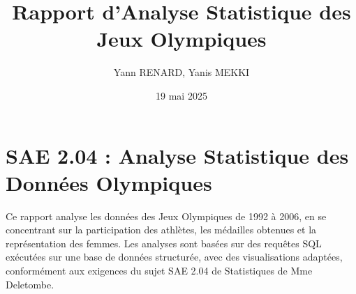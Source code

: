 \documentclass[fontsize=10pt,oneside]{scrreprt}
\title{Rapport d'Analyse Statistique des Jeux Olympiques} %
\author{Yann RENARD, Yanis MEKKI} %
\date{19 mai 2025} %
\begin{document}
\maketitle %

\tableofcontents %

\part*{SAE 2.04 : Analyse Statistique des Données Olympiques}
Ce rapport analyse les données des Jeux Olympiques de 1992 à 2006, en se concentrant sur la participation des athlètes, les médailles obtenues et la représentation des femmes. Les analyses sont basées sur des requêtes SQL exécutées sur une base de données structurée, avec des visualisations adaptées, conformément aux exigences du sujet SAE 2.04 de Statistiques de Mme Deletombe.

\end{document}
